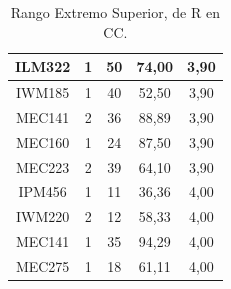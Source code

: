 \documentclass[12pt]{article}
\begin{document}
\begin{table}[H]
{{\begin{minipage}[b]{.5\hsize}
{\begin{tabular}{|c|c|c|c|c|}
            \rowcolor[HTML]{DAEBFB} 
            ILM322 & 1 & 50 & 74,00 & 3,90 \\ \hline
            \rowcolor[HTML]{DAEBFB} 
            IWM185 & 1 & 40 & 52,50 & 3,90 \\ \hline
            \rowcolor[HTML]{DAEBFB} 
            MEC141 & 2 & 36 & 88,89 & 3,90 \\ \hline
            \rowcolor[HTML]{DAEBFB} 
            MEC160 & 1 & 24 & 87,50 & 3,90 \\ \hline
            \rowcolor[HTML]{DAEBFB} 
            MEC223 & 2 & 39 & 64,10 & 3,90 \\ \hline
            \rowcolor[HTML]{DAEBFB} 
            IPM456 & 1 & 11 & 36,36 & 4,00 \\ \hline
            \rowcolor[HTML]{DAEBFB} 
            IWM220 & 2 & 12 & 58,33 & 4,00 \\ \hline
            \rowcolor[HTML]{DAEBFB} 
            MEC141 & 1 & 35 & 94,29 & 4,00 \\ \hline
            \rowcolor[HTML]{DAEBFB} 
            MEC275 & 1 & 18 & 61,11 & 4,00 \\ \hline
        \end{tabular}}
        \caption{Rango Extremo Superior, de R en CC.}
    \end{minipage}\hfil
}}
\end{table}
\end{document}
